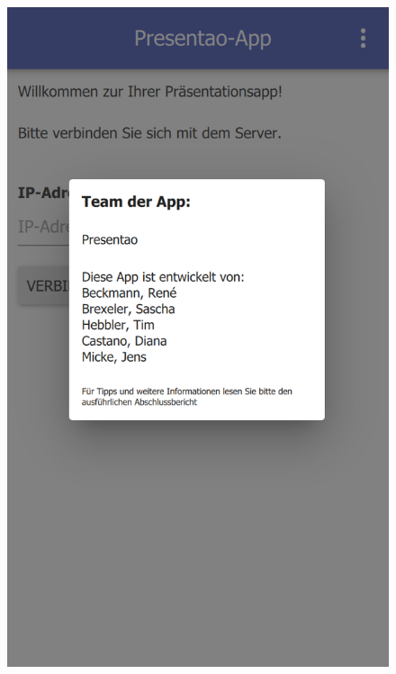 \begin{figure}[ht!]
\begin{minipage}{0.31\linewidth}
		\includegraphics[scale=0.5]{GUI/Bilder/1_0_1_Startbildschirm_PopUP_Team.PNG}
	\end{minipage}
	\begin{minipage}{0.31\linewidth}
		\centering

\end{minipage}
\end{figure}
